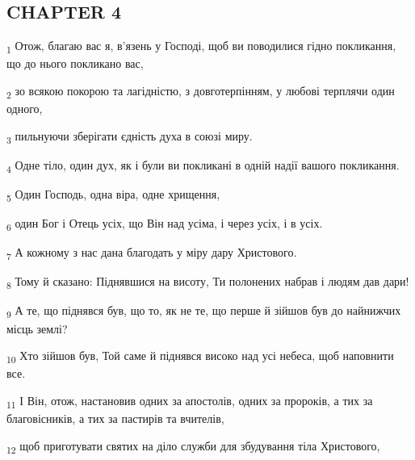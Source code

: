 \subsection{CHAPTER 4}
\begin{tcolorbox}
\textsubscript{1} Отож, благаю вас я, в'язень у Господі, щоб ви поводилися гідно покликання, що до нього покликано вас,
\end{tcolorbox}
\begin{tcolorbox}
\textsubscript{2} зо всякою покорою та лагідністю, з довготерпінням, у любові терплячи один одного,
\end{tcolorbox}
\begin{tcolorbox}
\textsubscript{3} пильнуючи зберігати єдність духа в союзі миру.
\end{tcolorbox}
\begin{tcolorbox}
\textsubscript{4} Одне тіло, один дух, як і були ви покликані в одній надії вашого покликання.
\end{tcolorbox}
\begin{tcolorbox}
\textsubscript{5} Один Господь, одна віра, одне хрищення,
\end{tcolorbox}
\begin{tcolorbox}
\textsubscript{6} один Бог і Отець усіх, що Він над усіма, і через усіх, і в усіх.
\end{tcolorbox}
\begin{tcolorbox}
\textsubscript{7} А кожному з нас дана благодать у міру дару Христового.
\end{tcolorbox}
\begin{tcolorbox}
\textsubscript{8} Тому й сказано: Піднявшися на висоту, Ти полонених набрав і людям дав дари!
\end{tcolorbox}
\begin{tcolorbox}
\textsubscript{9} А те, що піднявся був, що то, як не те, що перше й зійшов був до найнижчих місць землі?
\end{tcolorbox}
\begin{tcolorbox}
\textsubscript{10} Хто зійшов був, Той саме й піднявся високо над усі небеса, щоб наповнити все.
\end{tcolorbox}
\begin{tcolorbox}
\textsubscript{11} І Він, отож, настановив одних за апостолів, одних за пророків, а тих за благовісників, а тих за пастирів та вчителів,
\end{tcolorbox}
\begin{tcolorbox}
\textsubscript{12} щоб приготувати святих на діло служби для збудування тіла Христового,
\end{tcolorbox}
